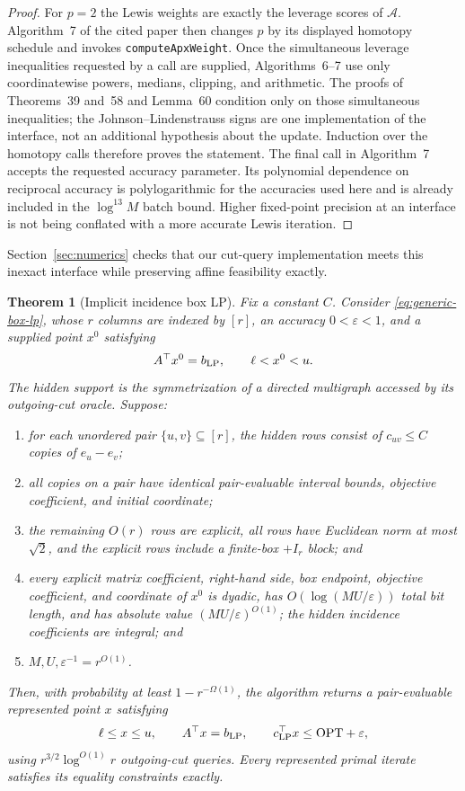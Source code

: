 \documentclass[11pt]{article}
\newtheorem{theorem}{Theorem}[section]
\theoremstyle{definition}
\newcommand{\eps}{\varepsilon}
\newcommand{\OPT}{\mathrm{OPT}}
\begin{document}
\begin{proof}
For $p=2$ the Lewis weights are exactly the leverage scores of $\mathcal A$.
Algorithm~7 of the cited paper then changes $p$ by its displayed homotopy
schedule and invokes \texttt{computeApxWeight}.  Once the simultaneous
leverage inequalities requested by a call are supplied, Algorithms~6--7 use
only coordinatewise powers, medians, clipping, and arithmetic.  The proofs of
Theorems~39 and~58 and Lemma~60 condition only on those simultaneous
inequalities; the
Johnson--Lindenstrauss signs are one implementation of the interface, not an
additional hypothesis about the update.  Induction over the homotopy calls
therefore proves the statement.  The final call in Algorithm~7 accepts the
requested accuracy parameter.  Its polynomial dependence on reciprocal
accuracy is polylogarithmic for the accuracies used here and is already
included in the $\log^{13}M$ batch bound.  Higher fixed-point precision at an
interface is not being conflated with a more accurate Lewis iteration.
\end{proof}

Section~\ref{sec:numerics} checks that our cut-query implementation meets
this inexact interface while preserving affine feasibility exactly.

\begin{theorem}[Implicit incidence box LP]\label{thm:implicit-lp}
Fix a constant $C$.  Consider \eqref{eq:generic-box-lp}, whose $r$ columns
are indexed by $[r]$, an accuracy $0<\eps<1$, and a supplied point $x^0$
satisfying
\[ 
        A^\top x^0=b_{\rm LP},\qquad \ell<x^0<u.
\]
The hidden support is the symmetrization of a directed multigraph accessed by
its outgoing-cut oracle.  Suppose:
\begin{enumerate}[label=(\roman*)]
\item for each unordered pair $\{u,v\}\subseteq[r]$, the hidden rows consist
      of $c_{uv}\le C$ copies of $e_u-e_v$;
\item all copies on a pair have identical pair-evaluable interval bounds,
      objective coefficient, and initial coordinate;
\item the remaining $O(r)$ rows are explicit, all rows have Euclidean norm at
      most $\sqrt2$, and the explicit rows include a finite-box $+I_r$ block;
      and
\item every explicit matrix coefficient, right-hand side, box endpoint,
      objective coefficient, and coordinate of $x^0$ is dyadic, has
      $O(\log(MU/\eps))$ total bit length, and has absolute value
      $(MU/\eps)^{O(1)}$; the hidden incidence coefficients are integral; and
\item $M,U,\eps^{-1}=r^{O(1)}$.
\end{enumerate}
Then, with probability at least $1-r^{-\Omega(1)}$, the algorithm returns a
pair-evaluable represented point $x$ satisfying
\[
 \ell\le x\le u,\qquad A^\top x=b_{\rm LP},\qquad
 c_{\rm LP}^\top x\le\OPT+\eps,
\]
using $r^{3/2}\log^{O(1)}r$ outgoing-cut queries.  Every represented primal
iterate satisfies its equality constraints exactly.
\end{theorem}
\end{document}
